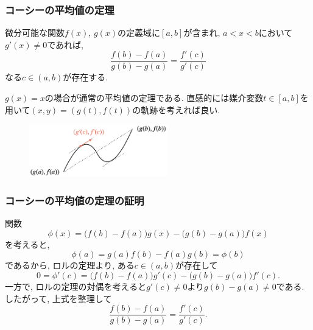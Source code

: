 \begin{frame}
\frametitle{コーシーの平均値の定理}

\vspace{-1mm}

\begin{Thm}[コーシーの平均値の定理] 
微分可能な関数$f(x)$, $g(x)$の定義域に$[a,b]$が含まれ, $a<x<b$において$g'(x) \ne 0$であれば, 
$$
\frac{f(b)-f(a)}{g(b)-g(a)}=\frac{f'(c)}{g'(c)}
$$
なる$c \in (a,b)$が存在する. 
\end{Thm}

$g(x)=x$の場合が通常の平均値の定理である. 
直感的には媒介変数$t \in [a,b]$を用いて$(x,y)=(g(t),f(t))$の軌跡を考えれば良い. 

\vspace{-1mm}

 \begin{figure}[htbp]
 \begin{center} 
  \includegraphics[width=60mm]{calculus8/CauchyMean.png}
 \end{center}
\end{figure}

\end{frame}







\begin{frame}
\frametitle{コーシーの平均値の定理の証明}

関数
$$
\phi(x)=\big(f(b)-f(a)\big)g(x)-\big(g(b)-g(a)\big)f(x)
$$
を考えると, 
$$
\phi(a)=g(a)f(b)-f(a)g(b)=\phi(b)
$$
であるから, ロルの定理より, ある$c \in (a,b)$が存在して
$$
0=\phi'(c)=\big(f(b)-f(a)\big)g'(c)-\big(g(b)-g(a)\big)f'(c). 
$$
一方で, ロルの定理の対偶を考えると$g'(c)\ne0$より$g(b)-g(a)\ne0$である. 
したがって, 上式を整理して
$$
\frac{f(b)-f(a)}{g(b)-g(a)}=\frac{f'(c)}{g'(c)}. 
$$



\end{frame}



